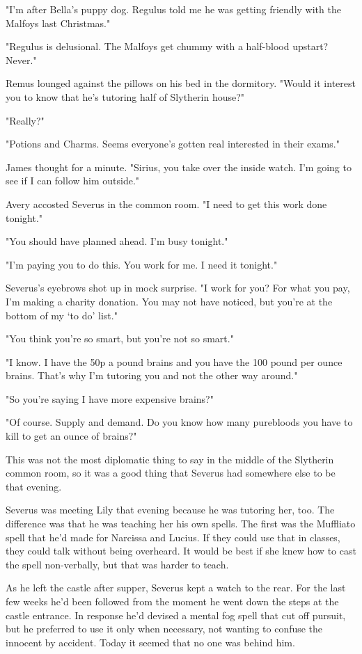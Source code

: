 "I'm after Bella's puppy dog. Regulus told me he was getting friendly with the Malfoys last Christmas."

"Regulus is delusional. The Malfoys get chummy with a half-blood upstart? Never."

Remus lounged against the pillows on his bed in the dormitory. "Would it interest you to know that he's tutoring half of Slytherin house?"

"Really?"

"Potions and Charms. Seems everyone's gotten real interested in their exams."

James thought for a minute. "Sirius, you take over the inside watch. I'm going to see if I can follow him outside."

Avery accosted Severus in the common room. "I need to get this work done tonight."

"You should have planned ahead. I'm busy tonight."

"I'm paying you to do this. You work for me. I need it tonight."

Severus's eyebrows shot up in mock surprise. "I work for you? For what you pay, I'm making a charity donation. You may not have noticed, but you're at the bottom of my `to do' list."

"You think you're so smart, but you're not so smart."

"I know. I have the 50p a pound brains and you have the 100 pound per ounce brains. That's why I'm tutoring you and not the other way around."

"So you're saying I have more expensive brains?"

"Of course. Supply and demand. Do you know how many purebloods you have to kill to get an ounce of brains?"

This was not the most diplomatic thing to say in the middle of the Slytherin common room, so it was a good thing that Severus had somewhere else to be that evening.

Severus was meeting Lily that evening because he was tutoring her, too. The difference was that he was teaching her his own spells. The first was the Muffliato spell that he'd made for Narcissa and Lucius. If they could use that in classes, they could talk without being overheard. It would be best if she knew how to cast the spell non-verbally, but that was harder to teach.

As he left the castle after supper, Severus kept a watch to the rear. For the last few weeks he'd been followed from the moment he went down the steps at the castle entrance. In response he'd devised a mental fog spell that cut off pursuit, but he preferred to use it only when necessary, not wanting to confuse the innocent by accident. Today it seemed that no one was behind him.

